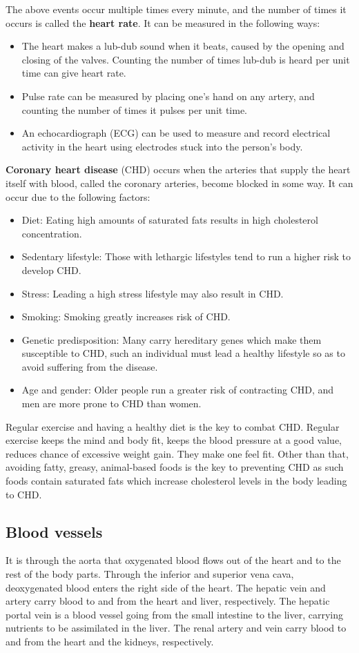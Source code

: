 The above events occur multiple times every minute, and the number of times it occurs is called the
\textbf{heart rate}. It can be measured in the following ways:
\begin{itemize}
	\item The heart makes a lub-dub sound when it beats, caused by the opening and closing of the
		valves. Counting the number of times lub-dub is heard per unit time can give heart rate.
	\item Pulse rate can be measured by placing one's hand on any artery, and counting the number
		of times it pulses per unit time.
	\item An echocardiograph (ECG) can be used to measure and record electrical activity in the
		heart using electrodes stuck into the person's body.
\end{itemize}
\textbf{Coronary heart disease} (CHD) occurs when the arteries that supply the heart itself with blood,
called the coronary arteries, become blocked in some way. It can occur due to the following 
factors:
\begin{itemize}
	\item Diet: Eating high amounts of saturated fats results in high cholesterol concentration.
	\item Sedentary lifestyle: Those with lethargic lifestyles tend to run a higher risk to develop
		CHD. 
	\item Stress: Leading a high stress lifestyle may also result in CHD.
	\item Smoking: Smoking greatly increases risk of CHD.
	\item Genetic predisposition: Many carry hereditary genes which make them susceptible to CHD,
		such an individual must lead a healthy lifestyle so as to avoid suffering from the disease.
	\item Age and gender: Older people run a greater risk of contracting CHD, and men are more 
		prone to CHD than women.
\end{itemize}
Regular exercise and having a healthy diet is the key to combat CHD. Regular exercise keeps the 
mind and body fit, keeps the blood pressure at a good value, reduces chance of excessive weight 
gain. They make one feel fit. Other than that, avoiding fatty, greasy, animal-based foods is the
key to preventing CHD as such foods contain saturated fats which increase cholesterol levels in the
body leading to CHD.

\subsection{Blood vessels}
It is through the aorta that oxygenated blood flows out of the heart and to the rest of the body parts. 
Through the inferior and superior vena cava, deoxygenated blood enters the right side of the heart.
The hepatic vein and artery carry blood to and from the heart and liver, respectively. The hepatic
portal vein is a blood vessel going from the small intestine to the liver, carrying nutrients to
be assimilated in the liver. The renal artery and vein carry blood to and from the heart and the
kidneys, respectively.

